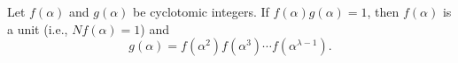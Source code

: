 Let $f(\alpha)$ and $g(\alpha)$ be cyclotomic integers. If $f(\alpha)g(\alpha) = 1$, then $f(\alpha)$ is a unit (i.e., $Nf(\alpha) = 1$) and
$$g(\alpha) = f(\alpha^2)f(\alpha^3)\cdots f(\alpha^{\lambda-1}).$$
